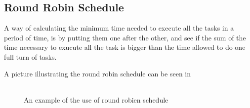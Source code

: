 \subsection{Round Robin Schedule}
A way of calculating the minimum time needed to execute all the tasks in a period of time, is by putting them one after the other, and see if the sum of the time necessary to exucute all the task is bigger than the time allowed to do one full turn of tasks.

A picture illustrating the round robin schedule can be seen in 

 \begin{figure}[H]
	\centering
	\includegraphics[width=0.8]{figures/roundRobinSchedule.pdf}
	\caption{An example of the use of round robien schedule}
	\label{roundRobinSchedule}
\end{figure}


